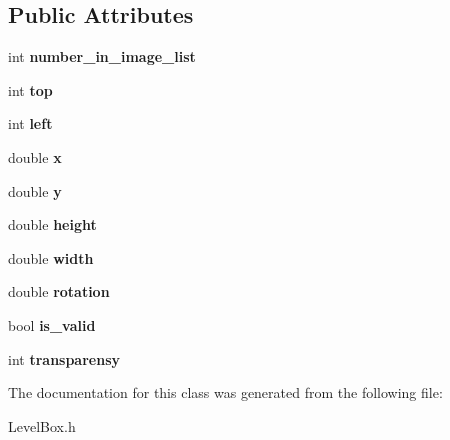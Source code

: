 \subsection*{Public Attributes}
\begin{DoxyCompactItemize}
\item 
\mbox{\label{class_object_a90c94b63236bf5be6946381db72641dc}} 
int {\bfseries number\+\_\+in\+\_\+image\+\_\+list}
\item 
\mbox{\label{class_object_ad3d50969ef24f16edb7337b76a99bb4e}} 
int {\bfseries top}
\item 
\mbox{\label{class_object_a7fc665396287cedde719083c0ec6d28f}} 
int {\bfseries left}
\item 
\mbox{\label{class_object_a02010c1708632be33a760486b1f648f8}} 
double {\bfseries x}
\item 
\mbox{\label{class_object_a542c4d6094ace575fb4a28f46b9cc6a1}} 
double {\bfseries y}
\item 
\mbox{\label{class_object_a811bf2cbf614c4f0a3935a83fb639ffd}} 
double {\bfseries height}
\item 
\mbox{\label{class_object_a3afad0ab476968e517b6f48c2a32719f}} 
double {\bfseries width}
\item 
\mbox{\label{class_object_afb2fc6bd0f2d6e62901f6b68ac7dfbc8}} 
double {\bfseries rotation}
\item 
\mbox{\label{class_object_ae0881e8e5fd72a025663b048f2444555}} 
bool {\bfseries is\+\_\+valid}
\item 
\mbox{\label{class_object_aff7027899040a66fc27b9c059f9c13f0}} 
int {\bfseries transparensy}
\end{DoxyCompactItemize}


The documentation for this class was generated from the following file\+:\begin{DoxyCompactItemize}
\item 
Level\+Box.\+h\end{DoxyCompactItemize}
